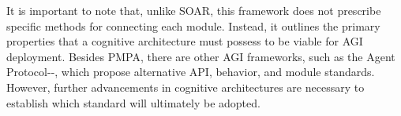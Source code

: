 It is important to note that, unlike SOAR, this framework does not prescribe
specific methods for connecting each module. Instead, it outlines the primary
properties that a cognitive architecture must possess to be viable for AGI
deployment. Besides PMPA, there are other AGI frameworks, such as the Agent
Protocol-\citet{engineerfoundation2023ap}-, which propose alternative API,
behavior, and module standards. However, further advancements in cognitive
architectures are necessary to establish which standard will ultimately be
adopted.


